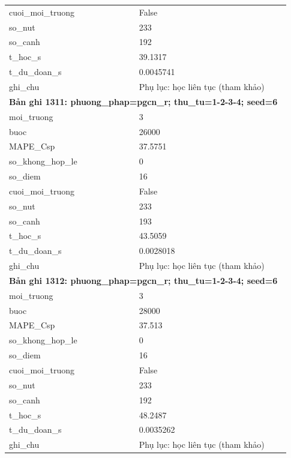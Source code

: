 \begin{longtable}{p{0.43\linewidth}p{0.50\linewidth}}
cuoi\_\allowbreak moi\_\allowbreak truong & False \\
so\_\allowbreak nut & 233 \\
so\_\allowbreak canh & 192 \\
t\_\allowbreak hoc\_\allowbreak s & 39.1317 \\
t\_\allowbreak du\_\allowbreak doan\_\allowbreak s & 0.0045741 \\
ghi\_\allowbreak chu & Phụ lục: học liên tục (tham khảo) \\
\midrule
\multicolumn{2}{p{0.95\linewidth}}{\textbf{Bản ghi 1311: phuong\_phap=pgcn\_r; thu\_tu=1-2-3-4; seed=6}} \\
moi\_\allowbreak truong & 3 \\
buoc & 26000 \\
MAPE\_\allowbreak Csp & 37.5751 \\
so\_\allowbreak khong\_\allowbreak hop\_\allowbreak le & 0 \\
so\_\allowbreak diem & 16 \\
cuoi\_\allowbreak moi\_\allowbreak truong & False \\
so\_\allowbreak nut & 233 \\
so\_\allowbreak canh & 193 \\
t\_\allowbreak hoc\_\allowbreak s & 43.5059 \\
t\_\allowbreak du\_\allowbreak doan\_\allowbreak s & 0.0028018 \\
ghi\_\allowbreak chu & Phụ lục: học liên tục (tham khảo) \\
\midrule
\multicolumn{2}{p{0.95\linewidth}}{\textbf{Bản ghi 1312: phuong\_phap=pgcn\_r; thu\_tu=1-2-3-4; seed=6}} \\
moi\_\allowbreak truong & 3 \\
buoc & 28000 \\
MAPE\_\allowbreak Csp & 37.513 \\
so\_\allowbreak khong\_\allowbreak hop\_\allowbreak le & 0 \\
so\_\allowbreak diem & 16 \\
cuoi\_\allowbreak moi\_\allowbreak truong & False \\
so\_\allowbreak nut & 233 \\
so\_\allowbreak canh & 192 \\
t\_\allowbreak hoc\_\allowbreak s & 48.2487 \\
t\_\allowbreak du\_\allowbreak doan\_\allowbreak s & 0.0035262 \\
ghi\_\allowbreak chu & Phụ lục: học liên tục (tham khảo) \\

\end{longtable}
